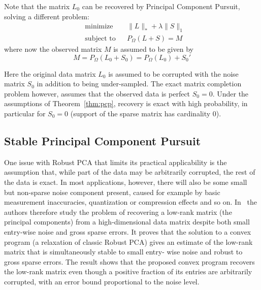 Note that the matrix $L_0$ can be recovered by Principal Component Pursuit, solving a different problem:
\begin{equation}
\begin{aligned}
&\text{minimize} && \|L\|_* + \lambda \|S\|_1\\
&\text{subject to} && P_\Omega (L+S) = M
\end{aligned}
\end{equation}
where now the observed matrix $M$ is assumed to be given by
\[
M = P_\Omega (L_0 + S_0) = P_\Omega (L_0) + S_0'
\]

Here the original data matrix $L_0$ is assumed to be corrupted with the noise matrix $S_0$ in addition to being under-sampled. The exact matrix completion problem however, assumes that the observed data is perfect $S_0 = 0$. Under the assumptions of Theorem~\ref{thm:pcp}, recovery is exact with high probability, in particular for $S_0 = 0$ (support of the sparse matrix has cardinality $0$).




\subsection{Stable Principal Component Pursuit}

One issue with Robust PCA that limits its practical applicability is the assumption that, while part of the data may be arbitrarily corrupted, the rest of the data is exact. In most applications, however, there will also be some small but non-sparse noise component present, caused for example by basic measurement inaccuracies, quantization or compression effects and so on. In~\cite{Zhou:2010vn} the authors therefore study the problem of recovering a low-rank matrix (the principal components) from a high-dimensional data matrix despite both small entry-wise noise and gross sparse errors. It proves that the solution to a convex program (a relaxation of classic Robust PCA) gives an estimate of the low-rank matrix that is simultaneously stable to small entry- wise noise and robust to gross sparse errors. The result shows that the proposed convex program recovers the low-rank matrix even though a positive fraction of its entries are arbitrarily corrupted, with an error bound proportional to the noise level.

